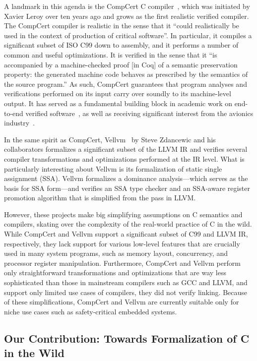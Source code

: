 A landmark in this agenda is the CompCert C compiler~\cite{compcert}, which was initiated by Xavier
Leroy over ten years ago and grows as the first realistic verified compiler.  The CompCert compiler
is realistic in the sense that it ``could realistically be used in the context of production of
critical software''.  In particular, it compiles a significant subset of ISO C99 down to assembly,
and it performs a number of common and useful optimizations.  It is verified in the sense that it
``is accompanied by a machine-checked proof [in Coq] of a semantic preservation property: the
generated machine code behaves as prescribed by the semantics of the source program.''  As such,
CompCert guarantees that program analyses and verifications performed on its input carry over
soundly to its machine-level output.  It has served as a fundamental building block in academic work
on end-to-end verified software~\cite{TODO}, as well as receiving significant interest from the
avionics industry~\cite{TODO}.

In the same spirit as CompCert, Vellvm~\cite{vellvm} by Steve Zdancewic and his collaborators
formalizes a significant subset of the LLVM IR and verifies several compiler transformations and
optimizations performed at the IR level.  What is particularly interesting about Vellvm is its
formalization of static single assignment (SSA).  Vellvm formalizes a dominance analysis---which
serves as the basis for SSA form---and verifies an SSA type checker and an SSA-aware register
promotion algorithm that is simplified from the  pass in LLVM.

However, these projects make big simplifying assumptions on C semantics and compilers, skating over
the complexity of the real-world practice of C in the wild.  While CompCert and Vellvm support a
significant subset of C99 and LLVM IR, respectively, they lack support for various low-level
features that are crucially used in many system programs, such as memory layout, concurrency, and
processor register manipulation.  Furthermore, CompCert and Vellvm perform only straightforward
transformations and optimizations that are way less sophisticated than those in mainstream compilers
such as GCC and LLVM, and support only limited use cases of compilers, \eg{} they did not verify
linking.  Because of these simplifications, CompCert and Vellvm are currently suitable only for
niche use cases such as safety-critical embedded systems.


\subsection{Our Contribution: Towards Formalization of C in the Wild}

